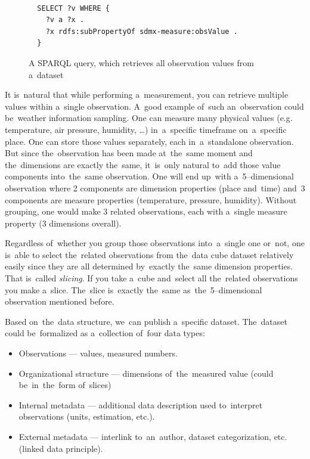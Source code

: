 \begin{figure}
\begin{verbatim}
  
  SELECT ?v WHERE {
    ?v a ?x .
    ?x rdfs:subPropertyOf sdmx-measure:obsValue .
  }

\end{verbatim}
\caption{A SPARQL query, which retrieves all observation values from a~dataset}
\label{fig:sparql-obsValue}
\end{figure}

It is~natural that while performing a~measurement, you can retrieve multiple
values within a~single observation. A~good example of~such an~observation could be~weather
information sampling. One can measure many physical values (e.g. temperature, air pressure,
humidity, …) in~a~specific timeframe on~a~specific place. One can store those values separately,
each in~a~standalone observation. But since the~observation has been made at~the~same moment
and the~dimensions are exactly the~same, it~is~only natural to~add those value components
into~the~same observation. One will end up~with a~5--dimensional observation where 2 components 
are dimension properties (place and~time) and~3 components are measure properties
(temperature, pressure, humidity). Without grouping, one would make 3 related observations,
each with a~single measure property (3 dimensions overall).

Regardless of~whether you group those observations into~a~single one or~not, one is~able
to select the~related observations from the~data cube dataset relatively easily since they
are all determined by~exactly the~same dimension properties. That is~called \emph{slicing}.
If you take a~cube and~select all the~related observations you make a~slice. The~slice is~exactly
the~same as~the~5--dimensional observation mentioned before.

Based on~the~data structure, we~can publish a~specific dataset. The~dataset could be~formalized
as a~collection of~four data types:
\begin{sloppypar}
\begin{itemize}
\item Observations --- values, measured numbers.
\item Organizational structure --- dimensions of~the~measured value (could be~in~the~form of~slices)
\item Internal metadata --- additional data description used to~interpret observations (units, estimation,
etc.).
\item External metadata --- interlink to~an~author, dataset categorization, etc. (linked data 
principle).
\end{itemize}
\end{sloppypar}

